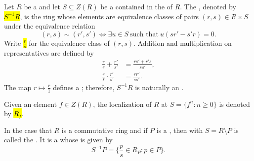 \begin{definition} \label{definition:localization_of_a_commutative_ring_by_a_multiplicative_subset}

Let $R$ be a  and let $S \subseteq Z(R)$ be a  contained in the  of $R$.  
The , denoted by \hl{$S^{-1}R$}, is the ring whose elements are equivalence classes of pairs $(r,s) \in R \times S$ under the equivalence relation
$$(r,s) \sim (r',s') \iff \exists u \in S \ \text{such that}\ u(sr' - s'r) = 0.$$
Write \hl{$\frac{r}{s}$} for the equivalence class of $(r,s)$. Addition and multiplication on representatives are defined by
\begin{align*}
\frac{r}{s} + \frac{r'}{s'} &= \frac{rs' + r's}{ss'}, \\
\frac{r}{s} \cdot \frac{r'}{s'} &= \frac{rr'}{ss'}.
\end{align*}
The map $r \mapsto \frac{r}{1}$ defines a ; therefore, $S^{-1}R$ is naturally an .

Given an element $f \in Z(R)$, the localization of $R$ at $S = \{f^n: n\geq 0 \}$ is denoted by \hl{$R_f$}.


In the case that $R$ is a commutative ring and if $P$ is a , then  with $S = R \setminus P$ is called the . It is a  whose  is given by 
$$S^{-1}P = \{ \frac{p}{s} \in R_P: p \in P \}.$$
\end{definition}

